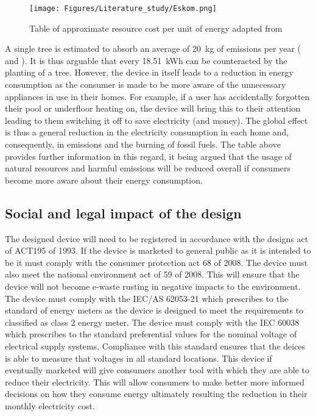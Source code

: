 \begin{figure}[H]
    \centering
    \texttt{[image: Figures/Literature\_study/Eskom.png]}
    \caption{Table of approximate resource cost per unit of energy adapted from \cite{Eskom-2021}}
    \label{fig:Eskom_report}
\end{figure}
A single tree is estimated to absorb an average of  \qty{20}{\kilogram} of  emissions per year (\cite{power_tree} and \cite{ecotree}). It is thus arguable that every \qty{18.51}{\kWh} can be counteracted by the planting of a tree. However, the device in itself leads to a reduction in energy consumption as the consumer is made to be more aware of the unnecessary appliances in use in their homes. For example, if a user has accidentally forgotten their pool or underfloor heating on, the device will bring this to their attention leading to them switching it off to save electricity (and money). The global effect is thus a general reduction in the electricity consumption in each home and, consequently, in  emissions and the burning of fossil fuels. The table above provides further information in this regard, it being argued that the usage of natural resources and harmful emissions will be reduced overall if consumers become more aware about their energy consumption.
\subsection{Social and legal impact of the design}
The designed device will need to be registered in accordance with the designs act of ACT195 of 1993. 
If the device is marketed to general public as it is intended to be it must comply with the consumer protection act 68 of 2008.
The device must also meet the national environment act of 59 of 2008. This will ensure that the device will not become e-waste rusting in negative impacts to the environment. 
The device must comply with the IEC/AS 62053-21 which prescribes to the standard of energy meters as the device is designed to meet the requirements to classified as class 2 energy meter. 
The device must comply with the IEC 60038 which prescribes to the standard preferential values for the nominal voltage of electrical supply systems. Compliance with this standard ensures that the deices is able to measure that voltages in all standard locations.  
This device if eventually marketed will give consumers another tool with which they are able to reduce their electricity. This will allow consumers to make better more informed decisions on how they consume energy ultimately resulting the reduction in their monthly electricity cost.  
\newpage



